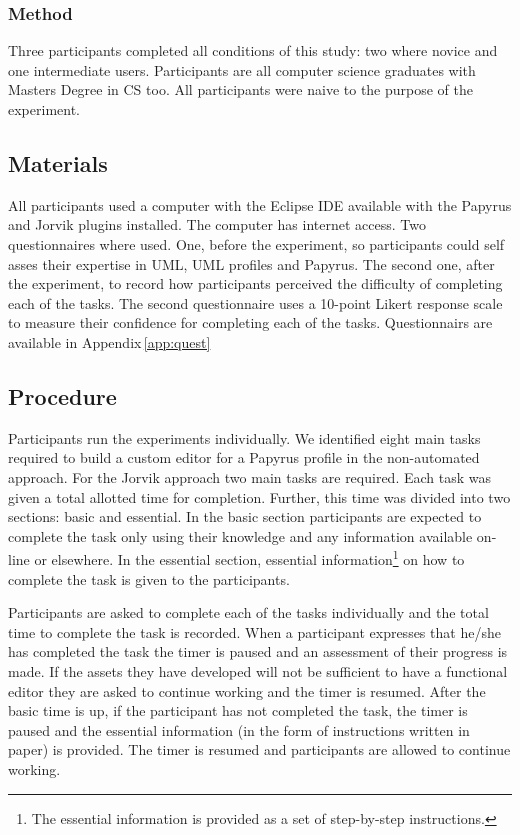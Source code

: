 \subsubsection{Method}
Three participants completed all conditions of this study: two where novice and one intermediate users.
Participants are all computer science graduates with Masters Degree in CS too.
All participants were naive to the purpose of the experiment.

\subsection{Materials}
All participants used a computer with the Eclipse IDE available with the Papyrus and Jorvik plugins installed.
The computer has internet access.
Two questionnaires where used. One, before the experiment, so participants could self asses their expertise in UML, UML profiles and Papyrus.
The second one, after the experiment, to record how participants perceived the difficulty of completing each of the tasks.
The second questionnaire uses a 10-point Likert response scale to measure their confidence for completing each of the tasks.
Questionnairs are available in Appendix\,\ref{app:quest}

\subsection{Procedure}
Participants run the experiments individually.
We identified eight main tasks required to build a custom editor for a Papyrus profile in the non-automated approach.
For the Jorvik approach two main tasks are required.
Each task was given a total allotted time for completion. Further, this time was divided into two sections: basic and essential.
In the basic section participants are expected to complete the task only using their knowledge and any information available on-line or elsewhere.
In the essential section, essential information\footnote{The essential information is provided as a set of step-by-step instructions.} on how to complete the task is given to the participants.

Participants are asked to complete each of the tasks individually and the total time to complete the task is recorded.
When a participant expresses that he/she has completed the task the timer is paused and an assessment of their progress is made.
If the assets they have developed will not be sufficient to have a functional editor they are asked to continue working and the timer is resumed.
After the basic time is up, if the participant has not completed the task, the timer is paused and the essential information (in the form of instructions written in paper)
is provided.
The timer is resumed and participants are allowed to continue working.

